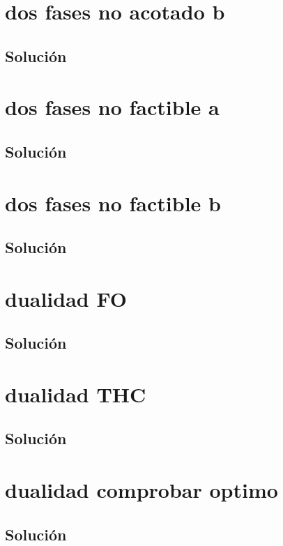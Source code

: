 \section{dos fases no acotado b}

\subsection*{Solución}

\clearpage
\section{dos fases no factible a}

\subsection*{Solución}

\clearpage
\section{dos fases no factible b}

\subsection*{Solución}

\clearpage
\section{dualidad FO}

\subsection*{Solución}

\clearpage
\section{dualidad THC}

\subsection*{Solución}

\clearpage
\section{dualidad comprobar optimo}

\subsection*{Solución}

\clearpage
